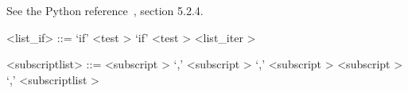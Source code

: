 
See the Python reference~\cite{pythonlang}, section 5.2.4.

\label{listzzzifb}

\begin{grammar}
<list_if> ::= `if' <test \myref[testb]>
	\alt `if' <test \myref[testb]> <list_iter \myref[listzzziterb]>
\end{grammar}


\label{subscriptlistb}

\begin{grammar}
<subscriptlist> ::= <subscript \myref[subscriptb]> `,'
	\alt <subscript \myref[subscriptb]> `,' <subscript \myref[subscriptb]>
	\alt <subscript \myref[subscriptb]> `,' <subscriptlist \myref[subscriptlistb]>
\end{grammar}


